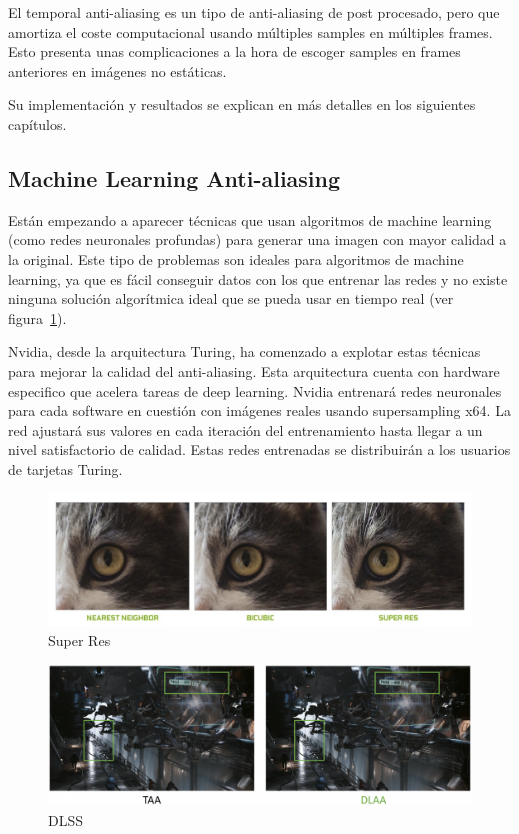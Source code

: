 \documentclass[withindex, glossary]{cam-thesis}
\begin{document}
El temporal anti-aliasing es un tipo de anti-aliasing de post procesado, pero que amortiza el coste computacional usando múltiples samples en múltiples frames. Esto presenta unas complicaciones a la hora de escoger samples en frames anteriores en imágenes no estáticas.

Su implementación y resultados se explican en más detalles en los siguientes capítulos.

\subsection{Machine Learning Anti-aliasing}

Están empezando a aparecer técnicas que usan algoritmos de machine learning (como redes neuronales profundas) para generar una imagen con mayor calidad a la original. Este tipo de problemas son ideales para algoritmos de machine learning, ya que es fácil conseguir datos con los que entrenar las redes y no existe ninguna solución algorítmica ideal que se pueda usar en tiempo real\cite{Huang-CVPR-2015}\cite{5459271} (ver figura~\ref{superres}).

Nvidia, desde la arquitectura Turing, ha comenzado a explotar estas técnicas para mejorar la calidad del anti-aliasing\cite{turingwhitepaper}. Esta arquitectura cuenta con hardware especifico que acelera tareas de deep learning. Nvidia entrenará redes neuronales para cada software en cuestión con imágenes reales usando supersampling x64. La red ajustará sus valores en cada iteración del entrenamiento hasta llegar a un nivel satisfactorio de calidad. Estas redes entrenadas se distribuirán a los usuarios de tarjetas Turing.

\begin{figure}[!htbp]
    \includegraphics[width=\linewidth]{figures/superres.png}
    \caption{Super Res\cite{turingwhitepaper}\label{superres}}
\end{figure}

\begin{figure}[!htbp]
    \includegraphics[width=\linewidth]{figures/dlss.png}
    \caption{DLSS\cite{turingwhitepaper}\label{fig:dlss}}
\end{figure}
\end{document}
